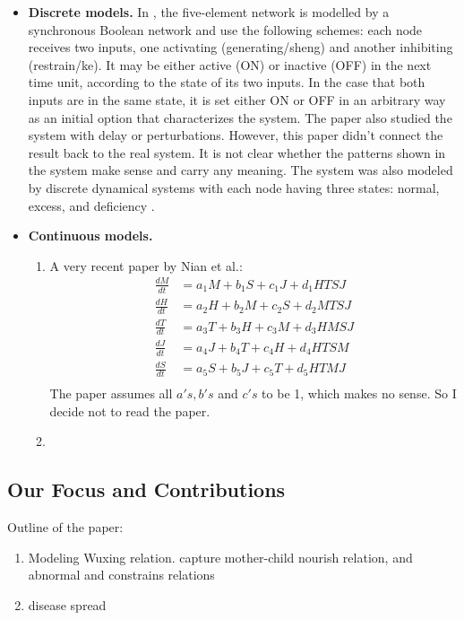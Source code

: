 \documentclass{article}
\begin{document}
\begin{itemize}
\item {\bf Discrete models.}
In \cite{Bellavite1998}, the five-element network is modelled by a synchronous Boolean network and use the following schemes: each node receives
two inputs, one activating (generating/sheng) and another inhibiting (restrain/ke). It may be
either active (ON) or inactive (OFF) in the next time unit, according to
the state of its two inputs. In the case that both
inputs are in the same state, it is set either ON or OFF in an arbitrary way as an initial option that characterizes the system. The paper also studied the system with delay or perturbations. However, this paper didn't connect the result back to the real system. It is not clear whether the patterns shown in the system make sense and carry any meaning. The system was also modeled by discrete dynamical systems with each node having three states: normal, excess, and deficiency \cite{Lin2020}. 

\item {\bf Continuous models.}
\begin{enumerate}
\item A very recent paper by Nian et al.\cite{Nian2025}: 
\[
\begin{array}{rl}
\frac{dM}{dt} &= a_1 M + b_1 S+ c_1 J + d_1 HTSJ \\
\frac{dH}{dt} &= a_2 H + b_2 M+ c_2S   + d_2 MTSJ \\
\frac{dT}{dt} &= a_3 T + b_3 H+ c_3 M + d_3 HMSJ \\
\frac{dJ}{dt} &= a_4 J + b_4 T + c_4 H + d_4 HTSM \\
\frac{dS}{dt} &= a_5 S + b_5 J+ c_5 T + d_5 HTMJ \\
\end{array}
\]
The paper assumes all $a's, b's$ and $c's$ to be 1, which makes no sense.   So I decide not to read the paper. 
\item 
\end{enumerate}

\end{itemize}

\subsection{Our Focus and Contributions}

Outline of the paper: 
\begin{enumerate}
\item Modeling Wuxing relation. capture mother-child nourish relation, and abnormal and constrains relations
\item disease spread 
\end{enumerate}
\end{document}
